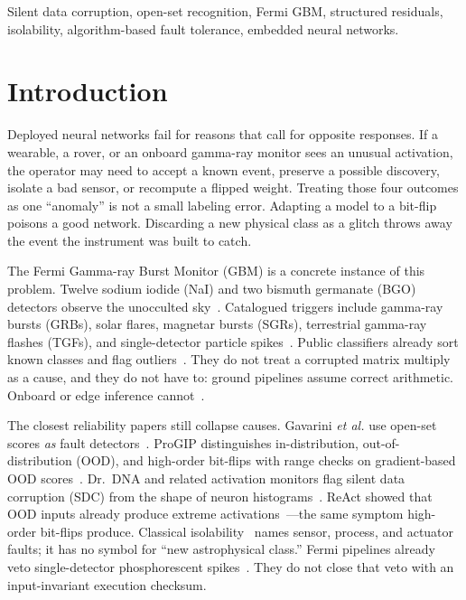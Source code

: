 \documentclass[journal]{IEEEtran}
\begin{document}
\begin{IEEEkeywords}
Silent data corruption, open-set recognition, Fermi GBM, structured residuals, isolability, algorithm-based fault tolerance, embedded neural networks.
\end{IEEEkeywords}

\section{Introduction}

Deployed neural networks fail for reasons that call for opposite responses. If a wearable, a rover, or an onboard gamma-ray monitor sees an unusual activation, the operator may need to accept a known event, preserve a possible discovery, isolate a bad sensor, or recompute a flipped weight. Treating those four outcomes as one ``anomaly'' is not a small labeling error. Adapting a model to a bit-flip poisons a good network. Discarding a new physical class as a glitch throws away the event the instrument was built to catch.

The Fermi Gamma-ray Burst Monitor (GBM) is a concrete instance of this problem. Twelve sodium iodide (NaI) and two bismuth germanate (BGO) detectors observe the unocculted sky~\cite{meegan2009,vonkienlin2020}. Catalogued triggers include gamma-ray bursts (GRBs), solar flares, magnetar bursts (SGRs), terrestrial gamma-ray flashes (TGFs), and single-detector particle spikes~\cite{goldstein2019,briggs2013}. Public classifiers already sort known classes and flag outliers~\cite{john2025}. They do not treat a corrupted matrix multiply as a cause, and they do not have to: ground pipelines assume correct arithmetic. Onboard or edge inference cannot~\cite{hochschild2021,dixit2021}.

The closest reliability papers still collapse causes. Gavarini \textit{et al.} use open-set scores \emph{as} fault detectors~\cite{gavarini2022}. ProGIP distinguishes in-distribution, out-of-distribution (OOD), and high-order bit-flips with range checks on gradient-based OOD scores~\cite{progip2025}. Dr.~DNA and related activation monitors flag silent data corruption (SDC) from the shape of neuron histograms~\cite{drdna2024,geissler2023}. ReAct showed that OOD inputs already produce extreme activations~\cite{react2021}---the same symptom high-order bit-flips produce. Classical isolability~\cite{gertler1990,isermann2006} names sensor, process, and actuator faults; it has no symbol for ``new astrophysical class.'' Fermi pipelines already veto single-detector phosphorescent spikes~\cite{goldstein2019,veske2025}. They do not close that veto with an input-invariant execution checksum.
\end{document}
